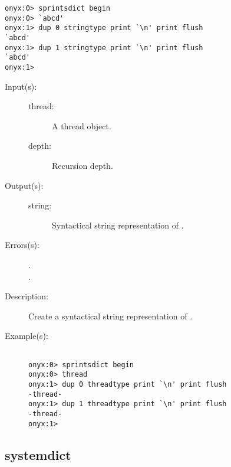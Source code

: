 \begin{description}
\begin{description}
\begin{verbatim}
onyx:0> sprintsdict begin
onyx:0> `abcd'
onyx:1> dup 0 stringtype print `\n' print flush
`abcd'
onyx:1> dup 1 stringtype print `\n' print flush
`abcd'
onyx:1>
		\end{verbatim}
	\end{description}
\label{sprintsdict:threadtype}
\item[{\onyxop{thread depth}{threadtype}{string}}: ]
	\begin{description}\item[]
	\item[Input(s): ]
		\begin{description}\item[]
		\item[thread: ]
			A thread object.
		\item[depth: ]
			Recursion depth.
		\end{description}
	\item[Output(s): ]
		\begin{description}\item[]
		\item[string: ]
			Syntactical string representation of .
		\end{description}
	\item[Errors(s): ]
		\begin{description}\item[]
		\item[.]
		\item[.]
		\end{description}
	\item[Description: ]
		Create a syntactical string representation of .
	\item[Example(s): ]\begin{verbatim}

onyx:0> sprintsdict begin
onyx:0> thread
onyx:1> dup 0 threadtype print `\n' print flush
-thread-
onyx:1> dup 1 threadtype print `\n' print flush
-thread-
onyx:1>
		\end{verbatim}
	\end{description}
\end{description}

\subsection{systemdict}
\label{sec:systemdict}

